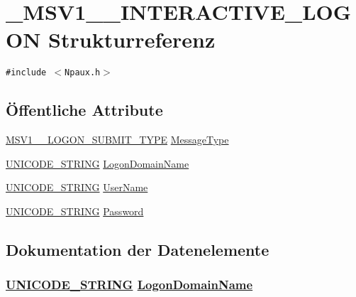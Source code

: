 \hypertarget{struct__MSV1__0__INTERACTIVE__LOGON}{
\section{\_\-MSV1\_\_\-INTERACTIVE\_\-LOGON Strukturreferenz}
\label{struct__MSV1__0__INTERACTIVE__LOGON}
}
{\tt \#include $<$Npaux.h$>$}

\subsection*{\"{O}ffentliche Attribute}
\begin{CompactItemize}
\item 
\hyperlink{Npaux_8h_a5}{MSV1\_\_\-LOGON\_\-SUBMIT\_\-TYPE} \hyperlink{struct__MSV1__0__INTERACTIVE__LOGON___MSV1__0__INTERACTIVE__LOGONo0}{Message\-Type}
\item 
\hyperlink{struct__UNICODE__STRING}{UNICODE\_\-STRING} \hyperlink{struct__MSV1__0__INTERACTIVE__LOGON___MSV1__0__INTERACTIVE__LOGONo1}{Logon\-Domain\-Name}
\item 
\hyperlink{struct__UNICODE__STRING}{UNICODE\_\-STRING} \hyperlink{struct__MSV1__0__INTERACTIVE__LOGON___MSV1__0__INTERACTIVE__LOGONo2}{User\-Name}
\item 
\hyperlink{struct__UNICODE__STRING}{UNICODE\_\-STRING} \hyperlink{struct__MSV1__0__INTERACTIVE__LOGON___MSV1__0__INTERACTIVE__LOGONo3}{Password}
\end{CompactItemize}


\subsection{Dokumentation der Datenelemente}
\hypertarget{struct__MSV1__0__INTERACTIVE__LOGON___MSV1__0__INTERACTIVE__LOGONo1}{
\subsubsection[LogonDomainName]{\setlength{\rightskip}{0pt plus 5cm}\hyperlink{struct__UNICODE__STRING}{UNICODE\_\-STRING} \hyperlink{struct__MSV1__0__INTERACTIVE__LOGON___MSV1__0__INTERACTIVE__LOGONo1}{Logon\-Domain\-Name}}}
\label{struct__MSV1__0__INTERACTIVE__LOGON___MSV1__0__INTERACTIVE__LOGONo1}




